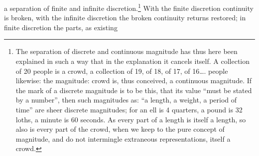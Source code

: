 \documentclass[12pt,a4paper,openany]{book}
\newcommand{\opage}[1]{\marginnote{\footnotesize\textit{[#1]}}}
\begin{document}
a separation of finite and infinite discretion.\footnote[1]{The separation of discrete and continuous magnitude has thus here been explained in such a way that in the explanation it cancels itself. A collection of 20 people is a crowd, a collection of 19, of 18, of 17, of 16\dots{}. people likewise: the magnitude: crowd is, thus conceived, a continuous magnitude. If the mark of a discrete magnitude is to be this, that its value ``must be stated by a number'', then such magnitudes as: ``a length, a weight, a period of time'' are sheer discrete magnitudes; for an ell is 4 quarters, a pound is 32 loths, a minute is 60 seconds. As every part of a length is itself a length, so also is every part of the crowd, when we keep to the pure concept of magnitude, and do not intermingle extraneous representations, itself a crowd.} With the %
\setcounter{footnote}{0}%
\opage{100}finite discretion continuity is broken, with the
infinite discretion the broken continuity returns
restored; in finite discretion the parts, as existing
\end{document}
